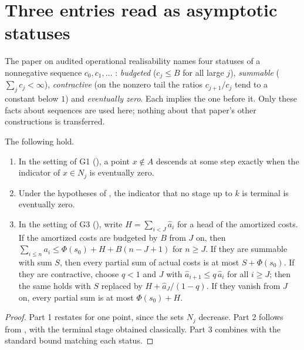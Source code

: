 \section{Three entries read as asymptotic statuses}
\label{supp:bridge}

The paper on audited operational realisability names four statuses of a nonnegative sequence
$c_0, c_1, \ldots$ \citep{Tsiokos2026AOR}: \emph{budgeted} ($c_j \le B$ for all large $j$),
\emph{summable} ($\sum_j c_j < \infty$), \emph{contractive} (on the nonzero tail the ratios
$c_{j+1}/c_j$ tend to a constant below $1$) and \emph{eventually zero}. Each implies the one before
it. Only these facts about sequences are used here; nothing about that paper's other constructions
is transferred.

\begin{proposition}\label{thm:currency-bridge}
The following hold.
\begin{enumerate}
  \item In the setting of G1 (), a point $x \notin A$ descends at some step exactly when the indicator
    of $x \in N_j$ is eventually zero.
  \item Under the hypotheses of , the indicator that no stage up to $k$ is terminal is
    eventually zero.
  \item In the setting of G3 (), write $H = \sum_{i < J} \widehat a_i$ for a head of the amortized
    costs. If the amortized costs are budgeted by $B$ from $J$ on, then $\sum_{i \le n} a_i \le
    \Phi(s_0) + H + B(n - J + 1)$ for $n \ge J$. If they are summable with sum $S$, then every
    partial sum of actual costs is at most $S + \Phi(s_0)$. If they are contractive, choose $q < 1$
    and $J$ with $\widehat a_{i+1} \le q\, \widehat a_i$ for all $i \ge J$; then the same holds with
    $S$ replaced by $H + \widehat a_J/(1-q)$. If they vanish from
    $J$ on, every partial sum is at most $\Phi(s_0) + H$.
\end{enumerate}
\end{proposition}

\begin{proof}
Part 1 restates  for one point, since the sets $N_j$ decrease. Part 2 follows from
, with the terminal stage obtained classically. Part 3 combines  with the
standard bound matching each status.
\end{proof}
